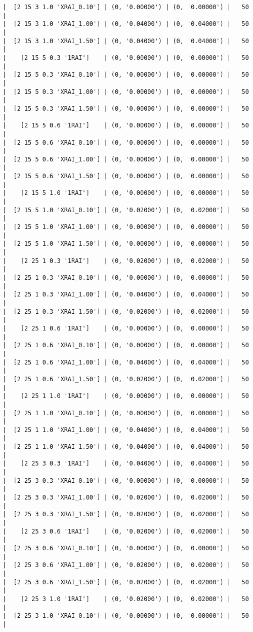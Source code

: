 \documentclass{article}
\begin{document}
\begin{verbatim}
|  [2 15 3 1.0 'XRAI_0.10'] | (0, '0.00000') | (0, '0.00000') |   50  |
|  [2 15 3 1.0 'XRAI_1.00'] | (0, '0.04000') | (0, '0.04000') |   50  |
|  [2 15 3 1.0 'XRAI_1.50'] | (0, '0.04000') | (0, '0.04000') |   50  |
|    [2 15 5 0.3 '1RAI']    | (0, '0.00000') | (0, '0.00000') |   50  |
|  [2 15 5 0.3 'XRAI_0.10'] | (0, '0.00000') | (0, '0.00000') |   50  |
|  [2 15 5 0.3 'XRAI_1.00'] | (0, '0.00000') | (0, '0.00000') |   50  |
|  [2 15 5 0.3 'XRAI_1.50'] | (0, '0.00000') | (0, '0.00000') |   50  |
|    [2 15 5 0.6 '1RAI']    | (0, '0.00000') | (0, '0.00000') |   50  |
|  [2 15 5 0.6 'XRAI_0.10'] | (0, '0.00000') | (0, '0.00000') |   50  |
|  [2 15 5 0.6 'XRAI_1.00'] | (0, '0.00000') | (0, '0.00000') |   50  |
|  [2 15 5 0.6 'XRAI_1.50'] | (0, '0.00000') | (0, '0.00000') |   50  |
|    [2 15 5 1.0 '1RAI']    | (0, '0.00000') | (0, '0.00000') |   50  |
|  [2 15 5 1.0 'XRAI_0.10'] | (0, '0.02000') | (0, '0.02000') |   50  |
|  [2 15 5 1.0 'XRAI_1.00'] | (0, '0.00000') | (0, '0.00000') |   50  |
|  [2 15 5 1.0 'XRAI_1.50'] | (0, '0.00000') | (0, '0.00000') |   50  |
|    [2 25 1 0.3 '1RAI']    | (0, '0.02000') | (0, '0.02000') |   50  |
|  [2 25 1 0.3 'XRAI_0.10'] | (0, '0.00000') | (0, '0.00000') |   50  |
|  [2 25 1 0.3 'XRAI_1.00'] | (0, '0.04000') | (0, '0.04000') |   50  |
|  [2 25 1 0.3 'XRAI_1.50'] | (0, '0.02000') | (0, '0.02000') |   50  |
|    [2 25 1 0.6 '1RAI']    | (0, '0.00000') | (0, '0.00000') |   50  |
|  [2 25 1 0.6 'XRAI_0.10'] | (0, '0.00000') | (0, '0.00000') |   50  |
|  [2 25 1 0.6 'XRAI_1.00'] | (0, '0.04000') | (0, '0.04000') |   50  |
|  [2 25 1 0.6 'XRAI_1.50'] | (0, '0.02000') | (0, '0.02000') |   50  |
|    [2 25 1 1.0 '1RAI']    | (0, '0.00000') | (0, '0.00000') |   50  |
|  [2 25 1 1.0 'XRAI_0.10'] | (0, '0.00000') | (0, '0.00000') |   50  |
|  [2 25 1 1.0 'XRAI_1.00'] | (0, '0.04000') | (0, '0.04000') |   50  |
|  [2 25 1 1.0 'XRAI_1.50'] | (0, '0.04000') | (0, '0.04000') |   50  |
|    [2 25 3 0.3 '1RAI']    | (0, '0.04000') | (0, '0.04000') |   50  |
|  [2 25 3 0.3 'XRAI_0.10'] | (0, '0.00000') | (0, '0.00000') |   50  |
|  [2 25 3 0.3 'XRAI_1.00'] | (0, '0.02000') | (0, '0.02000') |   50  |
|  [2 25 3 0.3 'XRAI_1.50'] | (0, '0.02000') | (0, '0.02000') |   50  |
|    [2 25 3 0.6 '1RAI']    | (0, '0.02000') | (0, '0.02000') |   50  |
|  [2 25 3 0.6 'XRAI_0.10'] | (0, '0.00000') | (0, '0.00000') |   50  |
|  [2 25 3 0.6 'XRAI_1.00'] | (0, '0.02000') | (0, '0.02000') |   50  |
|  [2 25 3 0.6 'XRAI_1.50'] | (0, '0.02000') | (0, '0.02000') |   50  |
|    [2 25 3 1.0 '1RAI']    | (0, '0.02000') | (0, '0.02000') |   50  |
|  [2 25 3 1.0 'XRAI_0.10'] | (0, '0.00000') | (0, '0.00000') |   50  |

\end{verbatim}
\end{document}
